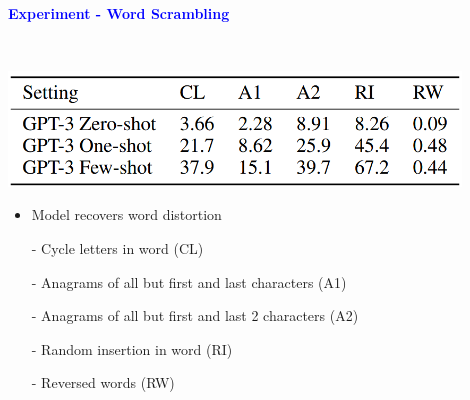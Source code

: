 \documentclass[professionalfont]{beamer}
\begin{document}
\begin{frame}

\begin{center}
    { \textbf{\textcolor{blue}{ {\fontsize{12}{14}\selectfont Experiment - Word Scrambling} }} }
\end{center}
\\[0.2cm]

\begin{center}
    \includegraphics[width=0.9\textwidth]{table/3-10.png}
\end{center}

{\fontsize{10}{14}\selectfont 
\begin{itemize}
    \item Model recovers word distortion

    - Cycle letters in word (CL)

    - Anagrams of all but first and last characters (A1)

    - Anagrams of all but first and last 2 characters (A2)

    - Random insertion in word (RI)

    - Reversed words (RW)

\end{itemize}
}

\end{frame}
\end{document}
